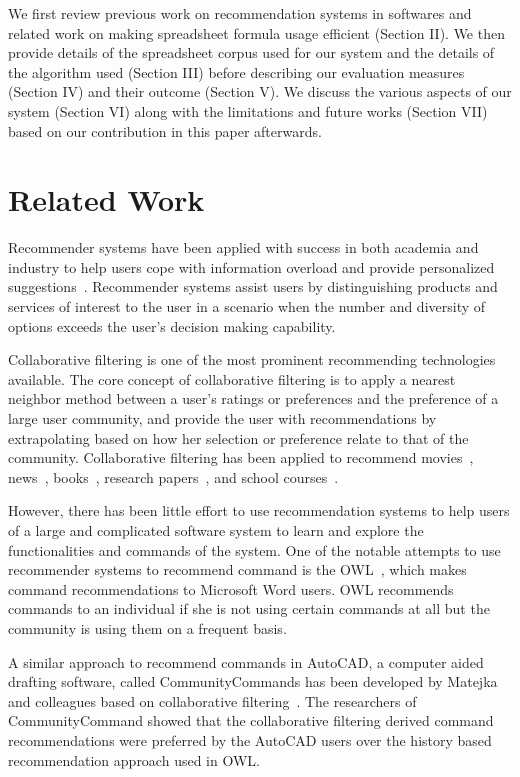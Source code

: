 \documentclass[conference]{IEEEtran}
\begin{document}
We first review previous work on recommendation systems in softwares and related work on making spreadsheet formula usage efficient (Section II). We then provide details of the spreadsheet corpus used for our system and the details of the algorithm used (Section III) before describing our evaluation measures (Section IV) and their outcome (Section V). We discuss the various aspects of our system (Section VI) along with the limitations and future works (Section VII) based on our contribution in this paper afterwards.

\section{Related Work}
Recommender systems have been applied with success in both academia and industry to help users cope with information overload and provide personalized suggestions~\cite{hill1995recommending, resnick1994grouplens,shardanand1995social}. Recommender systems assist users by distinguishing  products and services of interest to the user in a scenario when the number and diversity of options exceeds the user's decision making capability. 

Collaborative filtering is one of the most prominent recommending technologies available. The core concept of collaborative filtering is to apply a nearest neighbor method between a user's ratings or preferences and the preference of a large user community, and provide the user with recommendations by extrapolating based on how her selection or preference relate to that of the community. Collaborative filtering has been applied to recommend movies~\cite{miller2003movielens}, news~\cite{resnick1994grouplens}, books~\cite{linden2003amazon, liu2003adaptive}, research papers~\cite{mcnee2006don}, and school courses~\cite{farzan2006social, hsu2008personalized}. 

However, there has been little effort to use recommendation systems to help users of a large and complicated software system to learn and explore the functionalities and commands of the system. One of the notable attempts to use recommender systems to recommend command is the OWL~\cite{linton2000owl}, which makes command recommendations to Microsoft Word users. OWL recommends commands to an individual if she is not using certain commands at all but the community is using them on a frequent basis.

A similar approach to recommend commands in AutoCAD, a computer aided drafting software, called CommunityCommands has been developed by Matejka and colleagues based on collaborative filtering~\cite{matejka2009communitycommands}. The researchers of CommunityCommand showed that the collaborative filtering derived command recommendations were preferred by the AutoCAD users over the history based recommendation approach used in OWL.
\end{document}
